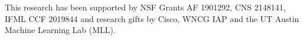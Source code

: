 This research has been supported by NSF Grants AF 1901292, CNS 2148141, IFML CCF 2019844 and research gifts by Cisco, WNCG IAP and the  UT Austin Machine Learning Lab (MLL).